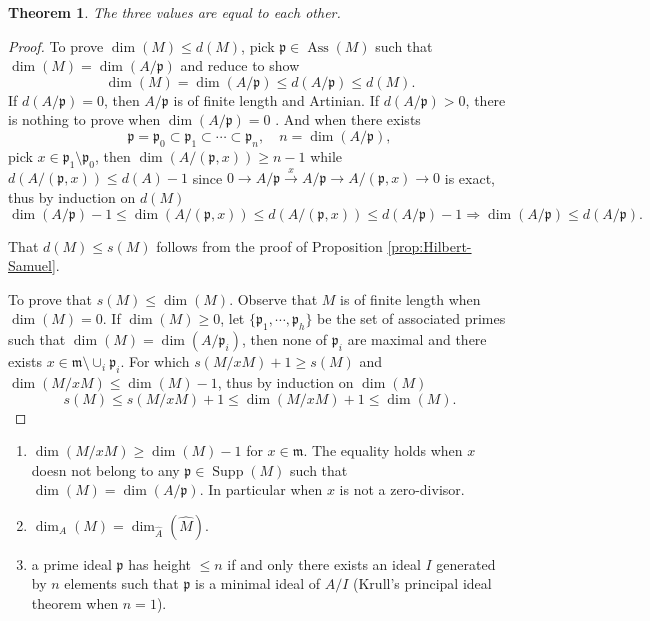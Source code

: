 \documentclass[leqno]{amsart}
\DeclareMathOperator{\Supp}{Supp}
\DeclareMathOperator{\Ass}{Ass}
\newcommand{\1}{\mathbf{1}}
\newcommand{\fm}{\mathfrak m}
\newcommand{\fp}{\mathfrak p}
\newtheorem{thm}{Theorem}[section]
\theoremstyle{definition}
\theoremstyle{remark}
\begin{document}
\begin{thm}
	The three values are equal to each other.
\end{thm}	
\begin{proof}
	To prove $\dim(M)\leq d(M)$,
	pick  $\fp\in \Ass(M)$ such that  $\dim(M)=\dim(A/\fp)$
	and reduce to show
	 \[
		 \dim(M)=\dim(A/\fp)\leq d(A/\fp)\leq d(M).
	\]
	If $d(A/\fp)=0$, then $A/\fp$ is of finite length and Artinian.
	If $d(A/\fp)>0$, there is nothing to prove when $\dim(A/\fp)=0$
	. And when there exists
	 \[
		 \fp=\fp_0\subset \fp_1\subset \cdots\subset \fp_n,\quad n=\dim(A/\fp),
	\]
	pick $x\in \fp_1\setminus \fp_0$, then  $\dim(A/(\fp,x))\geq n-1$ while  $d(A/(\fp,x))\leq d(A)-1$
	since $0\to A/\fp\xrightarrow{x} A/\fp\to A/(\fp,x)\to 0$ is exact, thus by induction on $d(M)$ 
	 \[
		 \dim(A/\fp)-1\leq \dim(A/(\fp,x))\leq d(A/(\fp,x))\leq d(A/\fp)-1
		 \Longrightarrow
		 \dim(A/\fp)\leq d(A/\fp).
	\]

	That $d(M)\leq s(M)$ follows from the proof of 
	Proposition \ref{prop:Hilbert-Samuel}.

	To prove that  $s(M)\leq \dim(M)$.
	Observe that  $M$ is of finite length when $\dim(M)=0$. 
	If $\dim(M)\geq 0$, let  $\{\fp_1,\cdots,\fp_h\}$ be the set of
	associated primes such that $\dim(M)=\dim(A/\fp_i)$,
	then none of $\fp_i$ are maximal and there exists  
	$x\in \fm\setminus \cup_i \fp_i$.
	For which $s(M/xM)+1\geq s(M)$ and $\dim(M/xM)\leq \dim(M)-1$, 
	thus by induction on  $\dim(M)$
	 \[
		 s(M)\leq s(M/xM)+1\leq \dim(M/xM)+1\leq \dim(M). 
	\]
\end{proof}
\begin{enumerate}
	\item   
	$\dim(M/xM)\geq \dim(M)-1$ for  $x\in \fm$.
	The equality holds when $x$ doesn not belong 
	to any $\fp\in \Supp(M)$ such that $\dim(M)=\dim(A/\fp)$.
	In particular when $x$ is not a zero-divisor.
	\item
	$\dim_A(M)=\dim_{\hat{A}}(\hat{M})$.
	\item
	a prime ideal $\fp$ has height  $\leq n$
	if and only there exists an ideal  $I$
	generated by  $n$ elements such that 
	$\fp$ is a minimal ideal of  $A/I$ 
	(Krull's principal ideal theorem when $n=1$).
\end{enumerate}
\end{document}
